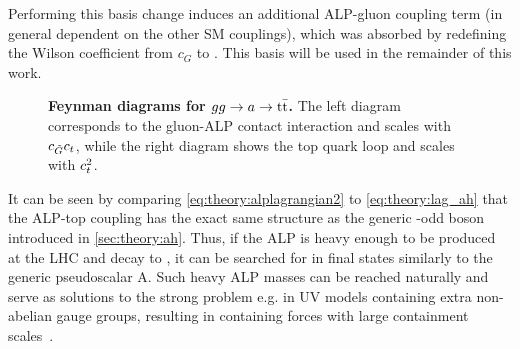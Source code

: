 Performing this basis change induces an additional ALP-gluon coupling term (in general dependent on the other SM couplings), which was absorbed by redefining the Wilson coefficient from $c_G$ to \cG. This basis will be used in the remainder of this work. 

\begin{figure}[!t]
    \centering
    \quad \quad
    \caption{\textbf{Feynman diagrams for $gg \rightarrow a \rightarrow \mathrm{t \bar{t}}$.} The left diagram corresponds to the gluon-ALP contact interaction and scales with $c_{\tilde{G}}c_t$, while the right diagram shows the top quark loop and scales with $c_t^2$.}
    \label{fig:theory:ggALP}
\end{figure}

It can be seen by comparing \cref{eq:theory:alplagrangian2} to \cref{eq:theory:lag_ah} that the ALP-top coupling has the exact same structure as the generic \CP-odd boson introduced in \cref{sec:theory:ah}. Thus, if the ALP is heavy enough to be produced at the LHC and decay to \ttbar, it can be searched for in \ttbar final states similarly to the generic pseudoscalar A. Such heavy ALP masses can  be reached naturally and serve as solutions to the strong \CP problem e.g. in UV models containing extra non-abelian gauge groups, resulting in containing forces with large containment scales~\cite{Rubakov:1997vp,Holdom:1982ex,Dimopoulos:2016lvn,Gherghetta:2016fhp}.

